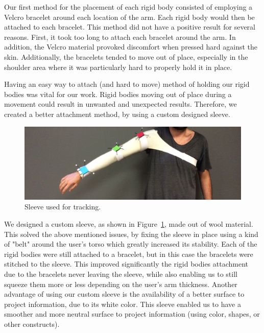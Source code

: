 Our first method for the placement of each rigid body consisted of employing a Velcro bracelet around each location of the arm. 
Each rigid body would then be attached to each bracelet. This method did not have a positive result for several reasons. 
First, it took too long to attach each bracelet around the arm. In addition, the Velcro material provoked discomfort when pressed hard against the skin. 
Additionally, the bracelets tended to move out of place, especially in the shoulder area where it was particularly hard to properly hold it in place.

Having an easy way to attach (and hard to move) method of holding our rigid bodies was vital for our work. 
Rigid bodies moving out of place during a movement could result in unwanted and unexpected results. 
Therefore, we created a better attachment method, by using a custom designed sleeve.


\begin{figure}[!t]
    \begin{center}
        \includegraphics[width=\textwidth]{imgs/impl/sleevewearable}
    \end{center}
    \caption{Sleeve used for tracking.}
    \label{fig:sleevewearable}
\end{figure}

We designed a custom sleeve, as shown in Figure~\ref{fig:sleevewearable}, made out of wool material. 
This solved the above mentioned issues, by fixing the sleeve in place using a kind of "belt" around the user's torso which greatly increased its stability. 
Each of the rigid bodies were still attached to a bracelet, but in this case the bracelets were stitched to the sleeve. 
This improved significantly the rigid bodies attachment due to the bracelets never leaving the sleeve, 
while also enabling us to still squeeze them more or less depending on the user's arm thickness.
Another advantage of using our custom sleeve is the availability of a better surface to project information, due to its white color. This sleeve enabled us to have a smoother and more neutral surface to project information (using color, shapes, or other constructs).  

